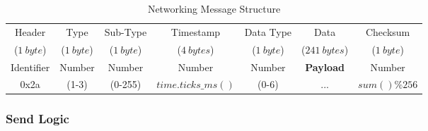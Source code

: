 \begin{table}[H]
    \centering
    \begin{tabular}{|c|c|c|c|c|c|c|}
        \hline
        Header & Type & Sub-Type  & Timestamp & Data Type & Data & Checksum \\
        ($1\ byte$) & ($1\ byte$) & ($1\ byte$) & ($4\ bytes$) & ($1\ byte$) & ($241\ bytes$) & ($1\ byte$) \\
        \hline
        Identifier & Number & Number & Number & Number & \textbf{Payload} & Number \\
        0x2a & (1-3) & (0-255) & $time.ticks\_ms()$ & (0-6) & ... & $sum() \% 256$ \\
        \hline
    \end{tabular}
    \vspace{\ftspace}
    \caption{Networking Message Structure}
    \label{tab:msg_struct}
\end{table}

\subsubsection{\label{sec:methods_send_logic}Send Logic}

